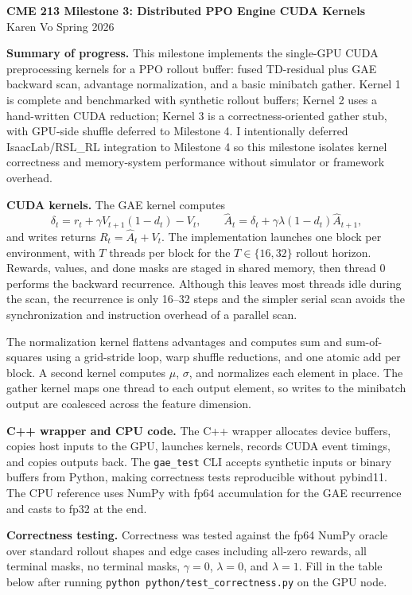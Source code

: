 \documentclass[11pt]{article}
\begin{document}
\begin{center}
{\Large \textbf{CME 213 Milestone 3: Distributed PPO Engine CUDA Kernels}}\\
Karen Vo \hfill Spring 2026
\end{center}

\textbf{Summary of progress.}
This milestone implements the single-GPU CUDA preprocessing kernels for a PPO rollout buffer: fused TD-residual plus GAE backward scan, advantage normalization, and a basic minibatch gather. Kernel 1 is complete and benchmarked with synthetic rollout buffers; Kernel 2 uses a hand-written CUDA reduction; Kernel 3 is a correctness-oriented gather stub, with GPU-side shuffle deferred to Milestone 4. I intentionally deferred IsaacLab/RSL\_RL integration to Milestone 4 so this milestone isolates kernel correctness and memory-system performance without simulator or framework overhead.

\textbf{CUDA kernels.}
The GAE kernel computes
\[
\delta_t = r_t + \gamma V_{t+1}(1-d_t) - V_t,\qquad
\hat A_t = \delta_t + \gamma\lambda(1-d_t)\hat A_{t+1},
\]
and writes returns $R_t=\hat A_t+V_t$. The implementation launches one block per environment, with $T$ threads per block for the $T \in \{16,32\}$ rollout horizon. Rewards, values, and done masks are staged in shared memory, then thread 0 performs the backward recurrence. Although this leaves most threads idle during the scan, the recurrence is only 16--32 steps and the simpler serial scan avoids the synchronization and instruction overhead of a parallel scan.

The normalization kernel flattens advantages and computes sum and sum-of-squares using a grid-stride loop, warp shuffle reductions, and one atomic add per block. A second kernel computes $\mu$, $\sigma$, and normalizes each element in place. The gather kernel maps one thread to each output element, so writes to the minibatch output are coalesced across the feature dimension.

\textbf{C++ wrapper and CPU code.}
The C++ wrapper allocates device buffers, copies host inputs to the GPU, launches kernels, records CUDA event timings, and copies outputs back. The \texttt{gae\_test} CLI accepts synthetic inputs or binary buffers from Python, making correctness tests reproducible without pybind11. The CPU reference uses NumPy with fp64 accumulation for the GAE recurrence and casts to fp32 at the end.

\textbf{Correctness testing.}
Correctness was tested against the fp64 NumPy oracle over standard rollout shapes and edge cases including all-zero rewards, all terminal masks, no terminal masks, $\gamma=0$, $\lambda=0$, and $\lambda=1$. Fill in the table below after running \texttt{python python/test\_correctness.py} on the GPU node.
\end{document}
